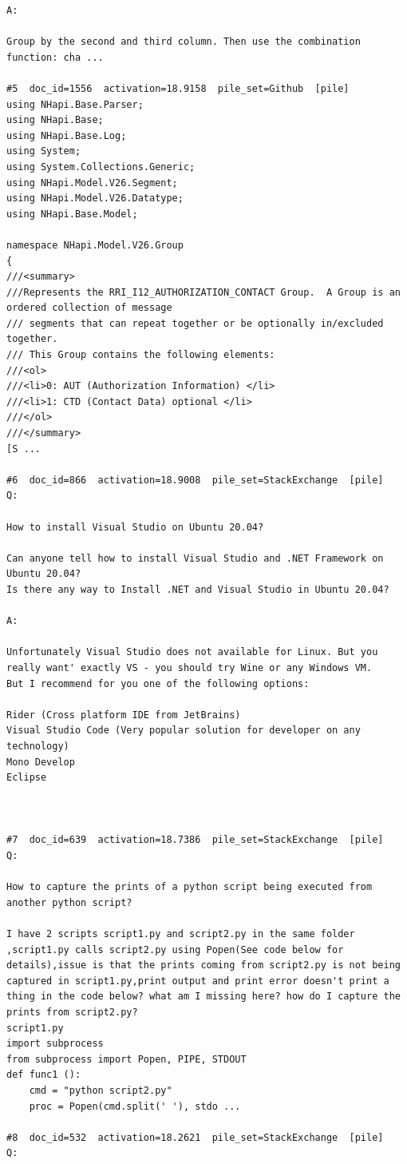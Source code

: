 \begin{verbatim}
A:

Group by the second and third column. Then use the combination function: cha ...

#5  doc_id=1556  activation=18.9158  pile_set=Github  [pile]
using NHapi.Base.Parser;
using NHapi.Base;
using NHapi.Base.Log;
using System;
using System.Collections.Generic;
using NHapi.Model.V26.Segment;
using NHapi.Model.V26.Datatype;
using NHapi.Base.Model;

namespace NHapi.Model.V26.Group
{
///<summary>
///Represents the RRI_I12_AUTHORIZATION_CONTACT Group.  A Group is an ordered collection of message 
/// segments that can repeat together or be optionally in/excluded together.
/// This Group contains the following elements: 
///<ol>
///<li>0: AUT (Authorization Information) </li>
///<li>1: CTD (Contact Data) optional </li>
///</ol>
///</summary>
[S ...

#6  doc_id=866  activation=18.9008  pile_set=StackExchange  [pile]
Q:

How to install Visual Studio on Ubuntu 20.04?

Can anyone tell how to install Visual Studio and .NET Framework on Ubuntu 20.04?
Is there any way to Install .NET and Visual Studio in Ubuntu 20.04?

A:

Unfortunately Visual Studio does not available for Linux. But you really want' exactly VS - you should try Wine or any Windows VM.
But I recommend for you one of the following options:

Rider (Cross platform IDE from JetBrains)
Visual Studio Code (Very popular solution for developer on any technology)
Mono Develop
Eclipse



#7  doc_id=639  activation=18.7386  pile_set=StackExchange  [pile]
Q:

How to capture the prints of a python script being executed from another python script?

I have 2 scripts script1.py and script2.py in the same folder ,script1.py calls script2.py using Popen(See code below for details),issue is that the prints coming from script2.py is not being captured in script1.py,print output and print error doesn't print a thing in the code below? what am I missing here? how do I capture the prints from script2.py?
script1.py
import subprocess
from subprocess import Popen, PIPE, STDOUT
def func1 ():
    cmd = "python script2.py"
    proc = Popen(cmd.split(' '), stdo ...

#8  doc_id=532  activation=18.2621  pile_set=StackExchange  [pile]
Q:


\end{verbatim}
